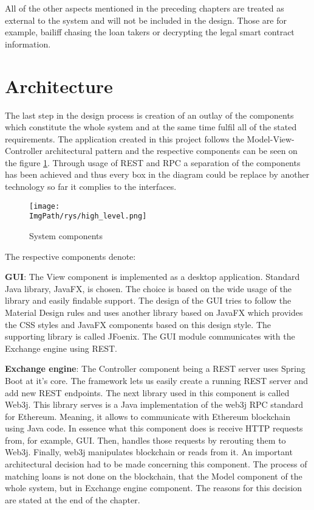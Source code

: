 \documentclass[a4paper,12pt,twoside,openany]{report}
\newcommand{\ImgPath}{.}
\begin{document}
All of the other aspects mentioned in the preceding chapters are treated as external to the system and will not be included in the design. Those are for example, bailiff chasing the loan takers or decrypting the legal smart contract information.

\section{Architecture} \label{architecture}

The last step in the design process is creation of an outlay of the components which constitute the whole system and at the same time fulfil all of the stated requirements. The application created in this project  follows the Model-View-Controller architectural pattern and the respective components can be seen on the figure \ref{system components}. Through usage of REST and RPC a separation of the components has been achieved and thus every box in the diagram could be replace by another technology so far it complies to the interfaces.

\begin{figure}[!htbp]
	\begin{center}
\centering
\texttt{[image: \\ImgPath/rys/high\_level.png]}
\end{center}
	\caption{System components}
	\label{system components}
\end{figure}

The respective components denote:

\textbf{GUI}: The View component is implemented as a desktop application. Standard Java library, JavaFX, is chosen. The choice is based on the wide usage of the library and easily findable support. The design of the GUI tries to follow the Material Design rules \cite{material} and uses another library based on JavaFX which provides the CSS styles and JavaFX components based on this design style. The supporting library is called JFoenix. The GUI module communicates with the Exchange engine using REST.

\textbf{Exchange engine}: The Controller component being a REST server uses Spring Boot at it's core. The framework lets us easily create a running REST server and add new REST endpoints. The next library used in this component is called Web3j. This library serves is a Java implementation of the web3j RPC standard for Ethereum. Meaning, it allows to communicate with Ethereum blockchain using Java code. In essence what this component does is receive HTTP requests from, for example, GUI. Then, handles those requests by rerouting them to Web3j. Finally, web3j manipulates blockchain or reads from it. An important architectural decision had to be made concerning this component. The process of matching loans is not done on the blockchain, that the Model component of the whole system, but in Exchange engine component. The reasons for this decision are stated at the end of the chapter.
\end{document}

